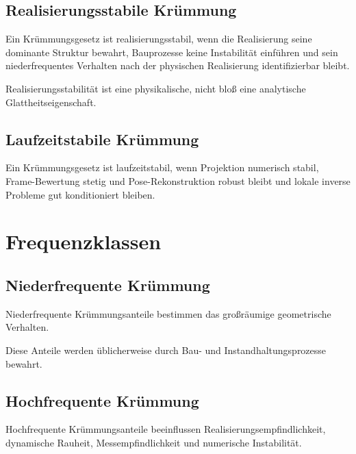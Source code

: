 \subsection{Realisierungsstabile Krümmung}
\begin{definition}
\label{def:realization-stable-curvature}
Ein Krümmungsgesetz ist realisierungsstabil, wenn die Realisierung seine
dominante Struktur bewahrt, Bauprozesse keine Instabilität einführen und sein
niederfrequentes Verhalten nach der physischen Realisierung identifizierbar
bleibt.
\end{definition}
Realisierungsstabilität ist eine physikalische, nicht bloß eine analytische
Glattheitseigenschaft.

\subsection{Laufzeitstabile Krümmung}
\begin{definition}
\label{def:runtime-stable-curvature}
Ein Krümmungsgesetz ist laufzeitstabil, wenn Projektion numerisch stabil,
Frame-Bewertung stetig und Pose-Rekonstruktion robust bleibt und lokale
inverse Probleme gut konditioniert bleiben.
\end{definition}

\section{Frequenzklassen}

\subsection{Niederfrequente Krümmung}
\begin{definition}
\label{def:low-frequency-curvature}
Niederfrequente Krümmungsanteile bestimmen das großräumige geometrische
Verhalten.
\end{definition}
Diese Anteile werden üblicherweise durch Bau- und Instandhaltungsprozesse
bewahrt.

\subsection{Hochfrequente Krümmung}
\begin{definition}
\label{def:high-frequency-curvature}
Hochfrequente Krümmungsanteile beeinflussen
Realisierungsempfindlichkeit, dynamische Rauheit, Messempfindlichkeit und
numerische Instabilität.
\end{definition}

